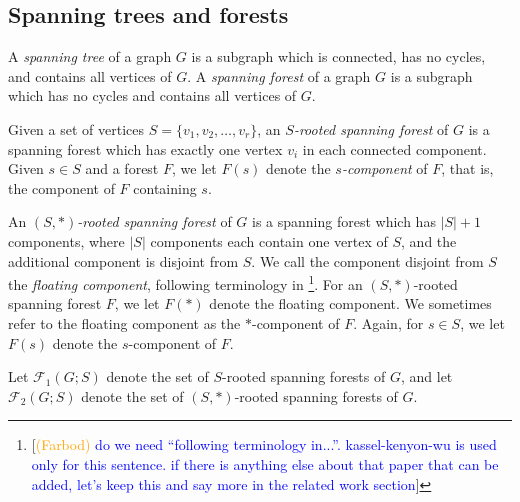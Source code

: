 \documentclass[12pt]{amsart}
\theoremstyle{definition}
\newcommand{\trees}{\mathcal{F}_1}
\newcommand{\forests}{\mathcal{F}}
\newcommand\farbod[1]{\footnote{[\textcolor{orange}{(Farbod)} \textcolor{blue}{#1}]}}
\begin{document}



\subsection{Spanning trees and forests}

A {\em spanning tree} of a graph $G$ is a subgraph which 
is connected, has no cycles,
and contains all vertices of $G$.
A {\em spanning forest} of a graph $G$ is a subgraph which 
has no cycles
and  contains all vertices of $G$. 



Given a set of vertices $S = \{v_1, v_2, \ldots, v_r\}$,
an {\em $S$-rooted spanning forest} of $G$ 
is a spanning forest which has exactly one vertex $v_i$ in each connected component.
Given $s \in S$ and a forest $F$, we let $F(s)$ denote the {\em $s$-component} of $F$, that is, the component of $F$ containing $s$.

An {\em $(S,*)$-rooted spanning forest} of $G$ is a spanning forest which has $|S|+1$ components, where $|S|$ components each contain one vertex of $S$, and the additional component is disjoint from $S$.
We call the component disjoint from $S$ the {\em floating component}, following terminology in \cite{kassel-kenyon-wu}\farbod{do we need ``following terminology in...''. kassel-kenyon-wu is used only for this sentence. if there is anything else about that paper that can be added, let's keep this and say more in the related work section}.
For an $(S,*)$-rooted spanning forest $F$, we let $F(*)$ denote the floating component. We sometimes refer to the floating component as the $*$-component of $F$. Again, for $s \in S$, we let $F(s)$ denote the $s$-component of $F$.

Let $\trees(G;S)$ denote the set of $S$-rooted spanning forests of $G$,
and let $\forests_2(G;S)$ denote the set of $(S,*)$-rooted spanning forests of $G$.
\end{document}
